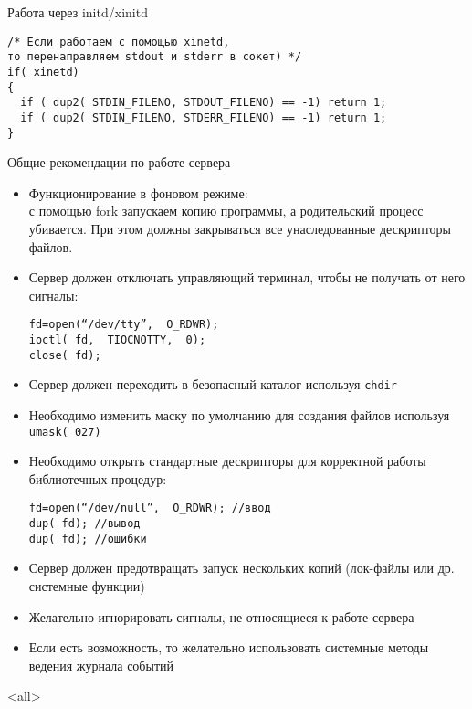 \begin{frame}[fragile]{Работа через initd/xinitd}
	\scriptsize	
\begin{lstlisting}[Language=C]
/* Если работаем с помощью xinetd, 
то перенаправляем stdout и stderr в сокет) */
if( xinetd) 
{ 
  if ( dup2( STDIN_FILENO, STDOUT_FILENO) == -1) return 1;
  if ( dup2( STDIN_FILENO, STDERR_FILENO) == -1) return 1;
} 
\end{lstlisting}
	\normalsize
\end{frame}

\begin{frame}[fragile]{Общие рекомендации по работе сервера}
	\scriptsize
	\begin{itemize}
		\item Функционирование в фоновом режиме:\\
			с помощью fork запускаем копию программы, а родительский процесс убивается. При этом должны закрываться все унаследованные дескрипторы файлов.
		\item Сервер должен отключать управляющий терминал,  чтобы не получать от него сигналы:\\
			\begin{verbatim}
fd=open(“/dev/tty”,  O_RDWR);
ioctl( fd,  TIOCNOTTY,  0);
close( fd);
			\end{verbatim}
		\item Сервер должен переходить в безопасный каталог используя {\tt chdir}
		\item Необходимо изменить маску по умолчанию для создания файлов используя {\tt umask( 027)}
		\item Необходимо открыть стандартные дескрипторы для корректной работы библиотечных процедур:\\
				\begin{verbatim}
fd=open(“/dev/null”,  O_RDWR); //ввод
dup( fd); //вывод
dup( fd); //ошибки
			\end{verbatim}
		\item Сервер должен предотвращать запуск нескольких копий (лок-файлы или др. системные функции)
		\item Желательно игнорировать сигналы,  не относящиеся к работе сервера
		\item Если есть возможность,  то желательно использовать системные методы ведения журнала событий
	\end{itemize}
\end{frame}

\mode<all>{}


